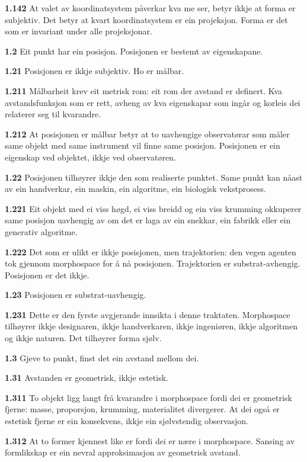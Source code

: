 \documentclass[11pt, a4paper]{article}
\newcommand{\subprop}[1]{\medskip\noindent\textbf{#1}\quad}
\begin{document}
\subprop{1.142} At valet av koordinatsystem p\aa verkar kva me ser, betyr ikkje at forma er subjektiv. Det betyr at kvart koordinatsystem er ein projeksjon. Forma er det som er invariant under alle projeksjonar.

\subprop{1.2} Eit punkt har ein posisjon. Posisjonen er bestemt av eigenskapane.

\subprop{1.21} Posisjonen er ikkje subjektiv. Ho er m\aa lbar.

\subprop{1.211} M\aa lbarheit krev eit metrisk rom: eit rom der avstand er definert. Kva avstandsfunksjon som er rett, avheng av kva eigenskapar som ing\aa r og korleis dei relaterer seg til kvarandre.

\subprop{1.212} At posisjonen er m\aa lbar betyr at to uavhengige observat\o rar som m\aa ler same objekt med same instrument vil finne same posisjon. Posisjonen er ein eigenskap ved objektet, ikkje ved observat\o ren.

\subprop{1.22} Posisjonen tilh\o yrer ikkje den som realiserte punktet. Same punkt kan n\aa ast av ein handverkar, ein maskin, ein algoritme, ein biologisk vekstprosess.

\subprop{1.221} Eit objekt med ei viss h\o gd, ei viss breidd og ein viss krumming okkuperer same posisjon uavhengig av om det er laga av ein snekkar, ein fabrikk eller ein generativ algoritme.

\subprop{1.222} Det som er ulikt er ikkje posisjonen, men trajektorien: den vegen agenten tok gjennom morphospace for \aa{} n\aa{} posisjonen. Trajektorien er substrat-avhengig. Posisjonen er det ikkje.

\subprop{1.23} Posisjonen er substrat-uavhengig.

\subprop{1.231} Dette er den fyrste avgjerande innsikta i denne traktaten. Morphospace tilh\o yrer ikkje designaren, ikkje handverkaren, ikkje ingeni\o ren, ikkje algoritmen og ikkje naturen. Det tilh\o yrer forma sj\o lv.

\subprop{1.3} Gjeve to punkt, finst det ein avstand mellom dei.

\subprop{1.31} Avstanden er geometrisk, ikkje estetisk.

\subprop{1.311} To objekt ligg langt fr\aa{} kvarandre i morphospace fordi dei er geometrisk fjerne: masse, proporsjon, krumming, materialitet divergerer. At dei ogs\aa{} er estetisk fjerne er ein konsekvens, ikkje ein sj\o lvstendig observasjon.

\subprop{1.312} At to former kjennest like er fordi dei er n\ae re i morphospace. Sansing av formlikskap er ein nevral approksimasjon av geometrisk avstand.
\end{document}
